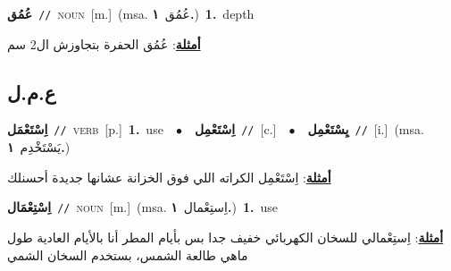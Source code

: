\documentclass[10pt,a4paper,twoside]{article} %
\begin{document}
\begin{multicols}{2}
{\setlength\topsep{0pt}\textbf{\foreignlanguage{arabic}{عُمُق}}\ {\color{gray}\texttt{//}\color{black}}\ \textsc{noun}\ [m.]\ \color{gray}(msa. \foreignlanguage{arabic}{عُمُق}~\foreignlanguage{arabic}{\textbf{١.}})\color{black}\ \textbf{1.}~depth\  \begin{flushright}\color{gray}\foreignlanguage{arabic}{\textbf{\underline{\foreignlanguage{arabic}{أمثلة}}}: عُمُق الحفرة بتجاوزش ال2 سم}\end{flushright}\color{black}} \vspace{2mm}

\vspace{-3mm}
\subsection*{\color{blue}\foreignlanguage{arabic}{ع.م.ل}\color{blue}{}} 

{\setlength\topsep{0pt}\textbf{\foreignlanguage{arabic}{اِسْتَعْمَل}}\ {\color{gray}\texttt{//}\color{black}}\ \textsc{verb}\ [p.]\ \textbf{1.}~use\ \ $\bullet$\ \ \setlength\topsep{0pt}\textbf{\foreignlanguage{arabic}{اِسْتَعْمِل}}\ {\color{gray}\texttt{//}\color{black}}\ [c.]\ \ $\bullet$\ \ \setlength\topsep{0pt}\textbf{\foreignlanguage{arabic}{يِسْتَعْمِل}}\ {\color{gray}\texttt{//}\color{black}}\ [i.]\ \color{gray}(msa. \foreignlanguage{arabic}{يَسْتَخْدِم}~\foreignlanguage{arabic}{\textbf{١.}})\color{black}\  \begin{flushright}\color{gray}\foreignlanguage{arabic}{\textbf{\underline{\foreignlanguage{arabic}{أمثلة}}}: اِسْتَعْمِل الكراته اللي فوق الخزانة عشانها جديدة أحسنلك}\end{flushright}\color{black}} \vspace{2mm}

{\setlength\topsep{0pt}\textbf{\foreignlanguage{arabic}{اِسْتِعْمَال}}\ {\color{gray}\texttt{//}\color{black}}\ \textsc{noun}\ [m.]\ \color{gray}(msa. \foreignlanguage{arabic}{اِستِعْمال}~\foreignlanguage{arabic}{\textbf{١.}})\color{black}\ \textbf{1.}~use\  \begin{flushright}\color{gray}\foreignlanguage{arabic}{\textbf{\underline{\foreignlanguage{arabic}{أمثلة}}}: اِستِعْمالي للسخان الكهربائي خفيف جدا بس بأيام المطر أنا بالأيام العادية طول ماهي طالعة الشمس، بستخدم السخان الشمي}\end{flushright}\color{black}} \vspace{2mm}


\end{multicols}
\end{document}
